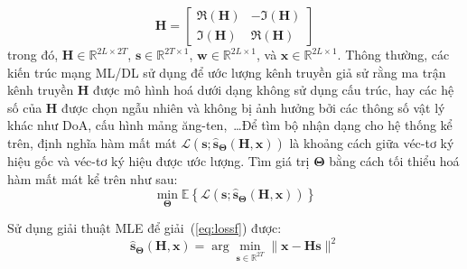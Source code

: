 \begin{equation}
\label{eq:matrixtras2}
    \mathbf{H}=\left[\begin{array}{cc}
    \Re(\mathbf{H}) & -\Im(\mathbf{H}) \\
    \Im(\mathbf{H}) & \Re(\mathbf{H})
    \end{array}\right]
\end{equation}
trong đó, $\mathbf{H} \in \mathbb{R}^{2L \times 2T}$, $\mathbf{s} \in \mathbb{R}^{2T \times 1}$, $\mathbf{w} \in \mathbb{R}^{2L \times 1}$, và $\mathbf{x} \in \mathbb{R}^{2L \times 1}$. Thông thường, các kiến trúc mạng ML/DL sử dụng để ước lượng kênh truyền giả sử rằng ma trận kênh truyền $\mathbf{H}$ được mô hình hoá dưới dạng không sử dụng cấu trúc, hay các hệ số của $\mathbf{H}$ được chọn ngẫu nhiên và không bị ảnh hưởng bởi các thông số vật lý khác như DoA, cấu hình mảng ăng-ten,~\ldots Để tìm bộ nhận dạng cho hệ thống kể trên, định nghĩa hàm mất mát $\mathcal{L}\left(\mathbf{s} ; \hat{\mathbf{s}}_{\boldsymbol{\Theta}}(\mathbf{H}, \mathbf{x})\right)$ là khoảng cách giữa véc-tơ ký hiệu gốc và véc-tơ ký hiệu được ước lượng. Tìm giá trị $\boldsymbol{\Theta}$ bằng cách tối thiểu hoá hàm mất mát kể trên như sau:
\begin{equation}
\label{eq:lossf}
\min _{\boldsymbol{\Theta}} \mathbb{E}\left\{\mathcal{L}\left(\mathbf{s} ; \hat{\mathbf{s}}_{\boldsymbol{\Theta}}(\mathbf{H}, \mathbf{x})\right)\right\}
\end{equation}

Sử dụng giải thuật MLE để giải~(\ref{eq:lossf}) được:
\begin{equation}
\label{eq:mle}
\hat{\mathbf{s}}_{\boldsymbol{\Theta}}(\mathbf{H}, \mathbf{x})=\arg \min _{\mathbf{s} \in \mathbb{R}^{2T}}\|\mathbf{x}-\mathbf{H} \mathbf{s}\|^2
\end{equation}

